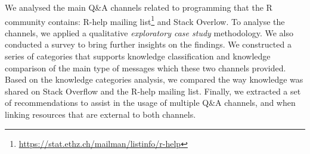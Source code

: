 \documentclass{sig-alternate-05-2015}
\begin{document}
We analysed the main Q\&A channels related to programming that the R community contains: R-help mailing list\footnote{\url{https://stat.ethz.ch/mailman/listinfo/r-help}} and Stack Overlow.
To analyse the channels, we applied a qualitative \textit{exploratory case study} methodology.
We also conducted a survey to bring further insights on the findings.
We constructed a series of categories that supports knowledge classification and knowledge comparison of the main type of messages which these two channels provided.
Based on the knowledge categories analysis, we compared the way knowledge was shared on Stack Overflow and the R-help mailing list.
Finally, we extracted a set of recommendations to assist in the usage of multiple Q\&A channels, and when linking resources that are external to both channels.



\end{document}
